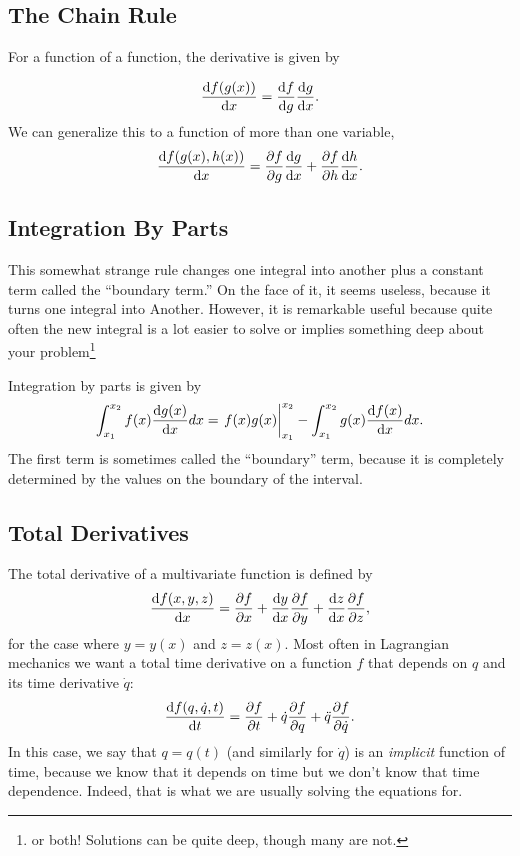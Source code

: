 \subsection{The Chain Rule}
\label{sec:chain_rule}
For a function of a function, the derivative is given by

\begin{equation}
  \label{eq:chain_rule_def}
  \dv{f(g(x))}{x} = \dv{f}{g} \dv{g}{x}.
\end{equation}
We can generalize this to a function of more than one variable,
\begin{equation}
  \label{eq:multivar_chain_rule_def}
  \dv{f(g(x), h(x))}{x} = \pdv{f}{g} \dv{g}{x} + \pdv{f}{h} \dv{h}{x}.
\end{equation}

\subsection{Integration By Parts}
\label{sec:IBP}
This somewhat strange rule changes one integral into another plus a constant term called the ``boundary term.''  On the face of it, it seems useless, because it turns one integral into Another. However, it is remarkable useful because quite often the new integral is a lot easier to solve or implies something deep about your problem\footnote{or both! Solutions can be quite deep, though many are not.}

Integration by parts is given by
\begin{equation}
  \label{eq:IBP_def}
  \int_{x_1}^{x_2} f(x) \dv{g(x)}{x} dx = \eval{f(x) g(x)}_{x_1}^{x_2} - \int_{x_1}^{x_2} g(x) \dv{f(x)}{x} dx.
\end{equation}
The first term is sometimes called the ``boundary'' term, because it is completely determined by the values on the boundary of the interval.

\subsection{Total Derivatives}
\label{sec:total_deriv}
The total derivative of a multivariate function is defined by
\begin{equation}
  \label{eq:total_deriv_lagrange}
  \dv{f(x, y, z)}{x} = \pdv{f}{x} + \dv{y}{x} \pdv{f}{y} + \dv{z}{x} \pdv{f}{z},
\end{equation}
for the case where $y = y(x)$ and $z = z(x)$. Most often in Lagrangian mechanics we want a total time derivative on a function $f$ that depends on $q$ and its time derivative $\dot{q}$:
\begin{equation}
  \label{eq:total_deriv_lagrange}
  \dv{f(q, \dot{q}, t)}{t} = \pdv{f}{t} + \dot{q} \pdv{f}{q} + \ddot{q} \pdv{f}{\dot{q}}.
\end{equation}
In this case, we say that $q = q(t)$ (and similarly for $\dot{q}$) is an \emph{implicit} function of time, because we know that it depends on time but we don't know that time dependence. Indeed, that is what we are usually solving the equations for.
